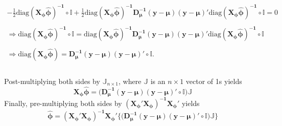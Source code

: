 \documentclass[useAMS,referee]{biom}
\begin{document}
\begin{equation}\label{eqphi}
\begin{array}{l}
-\frac{1}{2}\mbox{diag}\boldsymbol{ (\mathbf{X}_\phi \hat{\phi})^{-1}}\circ \mathbb{I}+\frac{1}{2}\mbox{diag}\boldsymbol{ (X_\phi \hat{\phi})^{-1}\mathbf{D}_\mu^{-1}}(\mathbf{y}-\boldsymbol{\mu})(\mathbf{y}-\boldsymbol{\mu})'\mbox{diag}\boldsymbol{( \mathbf{X}_\phi \hat{\phi})^{-1}}\circ \mathbb{I} =0 \nonumber\\~\\

\Rightarrow \mbox{diag}\boldsymbol{ (X_\phi \hat{\phi})^{-1}}\circ \mathbb{I}=\mbox{diag}\boldsymbol{ (\mathbf{X}_\phi \hat{\phi})^{-1}\mathbf{D}_\mu^{-1}}(\mathbf{y}-\boldsymbol{\mu})(\mathbf{y}-\boldsymbol{\mu})'\mbox{diag}\boldsymbol{( \mathbf{X}_\phi \hat{\phi})^{-1}} \nonumber\circ \mathbb{I}\\~\\



\Rightarrow\mbox{diag}\boldsymbol{ (\mathbf{X}_\phi \hat{\phi})}=\mathbf{D_\mu^{-1}}(\mathbf{y}-\boldsymbol{\mu})(\mathbf{y}-\boldsymbol{\mu})'\circ \mathbb{I}\nonumber.\\

\end{array}
\end{equation}\\
Post-multiplying both sides by $\mathbb{J}_{n \times 1}$, where $\mathbb{J}$ is an $n \times 1$ vector of 1s yields
\begin{equation}
 \boldsymbol{\mathbf{X}_\phi \hat{\phi}} = \mathbf{(D_\mu^{-1}}(\mathbf{y}-\boldsymbol{\mu})(\mathbf{y}-\boldsymbol{\mu})'\circ \mathbb{I}) \mathbb{J}
\end{equation}
Finally, pre-multiplying both sides by $\mathbf{(X_\phi'X_\phi)^{-1}X_\phi'}$ yields
\begin{equation}
\boldsymbol{\hat{\phi}} = \mathbf{(X_\phi'X_\phi)^{-1}X_\phi'}\mathbf{\{(D_\mu^{-1}}(\mathbf{y}-\boldsymbol{\mu})(\mathbf{y}-\boldsymbol{\mu})'\circ \mathbb{I}) \mathbb{J}\} 
\end{equation}


\end{document}
